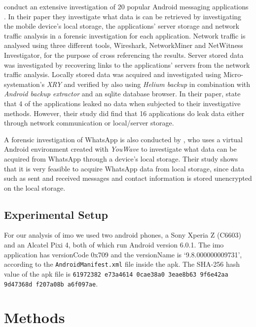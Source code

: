 \documentclass[conference]{IEEEtran}
\begin{document}
\citeauthor{walnycky2015network} conduct an extensive investigation of 20
popular Android messaging applications \cite{walnycky2015network}. In their
paper they investigate what data is can be retrieved by investigating the mobile
device's local storage, the applications' server storage and network traffic
analysis in a forensic investigation for each application. Network traffic is
analysed using three different tools, Wireshark, NetworkMiner and NetWitness
Investigator, for the purpose of cross referencing the results. Server stored
data was investigated by recovering links to the applications' servers from the
network traffic analysis. Locally stored data was acquired and investigated
using Micro-systemation's {\it XRY} and verified by also using {\it Helium
backup} in combination with {\it Android backup extractor} and an sqlite
database browser.  In their paper, \citeauthor{walnycky2015network} state that 4
of the applications leaked no data when subjected to their investigative
methods.  However, their study did find that 16 applications do leak data either
through network communication or local/server storage.

A forensic investigation of WhatsApp is also conducted by
\citeauthor{anglano2014forensic} \cite{anglano2014forensic}, who uses a virtual
Android environment created with {\it YouWave} to investigate what data can be
acquired from WhatsApp through a device's local storage. Their study shows that
it is very feasible to acquire WhatsApp data from local storage, since data such
as sent and received messages and contact information is stored unencrypted on
the local storage.

\subsection{Experimental Setup}\label{sec:setup}

For our analysis of imo we used two android phones, a Sony Xperia Z (C6603) and
an Alcatel Pixi 4, both of which run Android version 6.0.1. The imo application
has versionCode 0x709 and the versionName is `9.8.000000009731', according to
the \texttt{AndroidManifest.xml} file inside the apk. The SHA-256 hash value of
the apk file is \texttt{61972382 e73a4614 0cae38a0 3eae8b63 9f6e42aa 9d47368d
f207a08b a6f097ae}.


\section{Methods}\label{sec:method}
\end{document}
